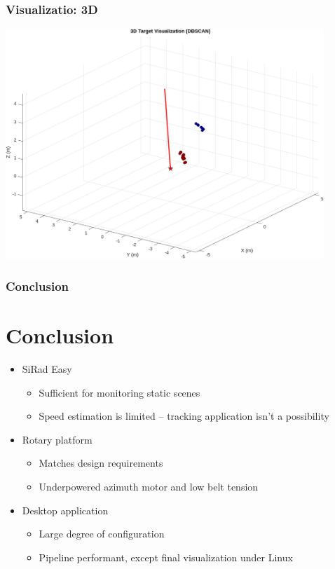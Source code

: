 \documentclass[aspectratio=43]{beamer}
\begin{document}
\begin{frame}[fragile]
  \frametitle{Visualizatio: 3D}
  \begin{center}
    \includegraphics[width=0.9\textwidth]{../img/vis_3d.jpg}
  \end{center}
\end{frame}


\begin{frame}[fragile]
  \frametitle{Conclusion}
  \section{Conclusion}
  \begin{itemize}
    \item SiRad Easy
      \begin{itemize}
        \item Sufficient for monitoring static scenes
        \item Speed estimation is limited -- tracking application isn't a possibility
      \end{itemize}
    \item Rotary platform
      \begin{itemize}
        \item Matches design requirements
        \item Underpowered azimuth motor and low belt tension
      \end{itemize}
		\item Desktop application
			\begin{itemize}
				\item Large degree of configuration
				\item Pipeline performant, except final visualization under Linux
			\end{itemize}
  \end{itemize}
\end{frame}
\end{document}
